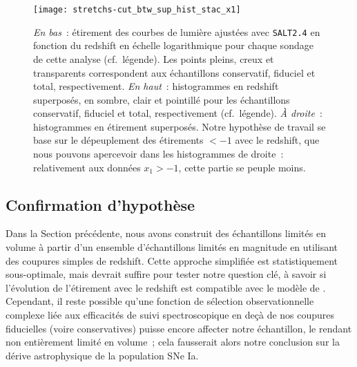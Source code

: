\documentclass[../main/main.tex]{subfiles}
\begin{document}
\begin{figure}
    \centering
    \texttt{[image: stretchs-cut\_btw\_sup\_hist\_stac\_x1]}
    \caption[Présentation des données d'étirement en fonction du redshift pour
    l'échantillon complet]{\textit{En bas}~: étirement des courbes de lumière
        ajustées avec \textsc{\texttt{SALT2.4}} en fonction du redshift en
        échelle logarithmique pour chaque sondage de cette analyse (cf.\
        légende). Les points pleins, creux et transparents correspondent aux
        échantillons conservatif, fiduciel et total, respectivement. \textit{En
        haut}~: histogrammes en redshift superposés, en sombre, clair et
        pointillé pour les échantillons conservatif, fiduciel et total,
        respectivement (cf.\ légende). \textit{À droite}~: histogrammes en
        étirement superposés. Notre hypothèse de travail se base sur le
        dépeuplement des étirements $< -1$ avec le redshift, que nous pouvons
        apercevoir dans les histogrammes de droite~: relativement aux données
    $x_1 > -1$, cette partie se peuple moins.}\label{fig:sample}
\end{figure}

\subsection{Confirmation d'hypothèse}\label{ssec:testvl}

% 

Dans la Section précédente, nous avons construit des échantillons limités en
volume à partir d'un ensemble d'échantillons limités en magnitude en utilisant
des coupures simples de redshift. Cette approche simplifiée est
statistiquement sous-optimale, mais devrait suffire pour tester notre question
clé, à savoir si l'évolution de l'étirement avec le redshift est compatible avec le
modèle de \cite{rigault2020}. Cependant, il reste possible qu'une fonction de
sélection observationnelle complexe liée aux efficacités de suivi
spectroscopique en deçà de nos coupures fiducielles (voire conservatives) puisse
encore affecter notre échantillon, le rendant non entièrement limité en volume~;
cela fausserait alors notre conclusion sur la dérive astrophysique de la
population SNe Ia.
\end{document}
